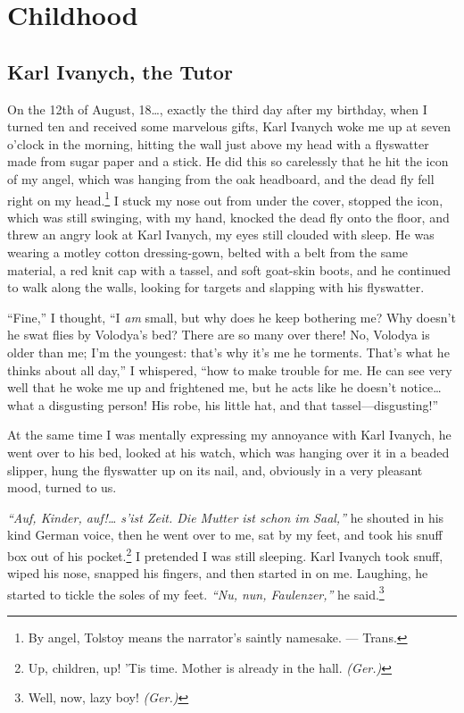 \part*{Childhood}

\chapter{Karl Ivanych, the Tutor} %

On the 12th of August, 18\ldots{}, exactly the third day after my birthday, when I turned ten and received some marvelous gifts, Karl Ivanych woke me up at seven o'clock in the morning, hitting the wall just above my head with a flyswatter made from sugar paper and a stick. He did this so carelessly that he hit the icon of my angel, which was hanging from the oak headboard, and the dead fly fell right on my head.\footnote{By angel, Tolstoy means the narrator's saintly namesake. --- Trans.} I stuck my nose out from under the cover, stopped the icon, which was still swinging, with my hand, knocked the dead fly onto the floor, and threw an angry look at Karl Ivanych, my eyes still clouded with sleep. He was wearing a motley cotton dressing-gown, belted with a belt from the same material, a red knit cap with a tassel, and soft goat-skin  boots, and he continued to walk along the walls, looking for targets and slapping with his flyswatter.

``Fine,'' I thought, ``I \emph{am} small, but why does he keep bothering me? Why doesn't he swat flies by Volodya's bed? There are so many over there! No, Volodya is older than me; I'm the youngest: that's why it's me he torments. That's what he thinks about all day,'' I whispered, ``how to make trouble for me. He can see very well that he woke me up and frightened me, but he acts like he doesn't notice\ldots{} what a disgusting person! His robe, his little hat, and that tassel---disgusting!'' %

At the same time I was mentally expressing my annoyance with Karl Ivanych, he went over to his bed, looked at his watch, which was hanging over it in a beaded slipper, hung the flyswatter up on its nail, and, obviously in a very pleasant mood, turned to us.

\textit{``Auf, Kinder, auf!\ldots{} s'ist Zeit. Die Mutter ist schon im Saal,''} he shouted in his kind German voice, then he went over to me, sat by my feet, and took his snuff box out of his pocket.\footnote{Up, children, up! 'Tis time. Mother is already in the hall. \textit{(Ger.)}} I pretended I was still sleeping. Karl Ivanych took snuff, wiped his nose, snapped his fingers, and then started in on me. Laughing, he started to tickle the soles of my feet. \textit{``Nu, nun, Faulenzer,''} he said.\footnote{Well, now, lazy boy! \textit{(Ger.)}} %

